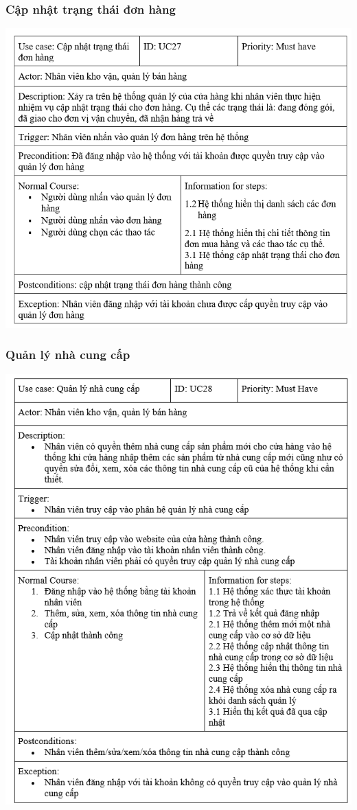 \documentclass[12pt,a4paper,2sides]{report}
\begin{document}
\subsubsection{Cập nhật trạng thái đơn hàng}
    \includegraphics[width=1\linewidth]{lib/usecase/capnhattrangthaidh.png}\\\vspace*{1cm}    
\subsubsection{Quản lý nhà cung cấp}
    \includegraphics[width=1\linewidth]{lib/usecase/quanlyncc.png}\\\vspace*{1cm} 
\end{document}
